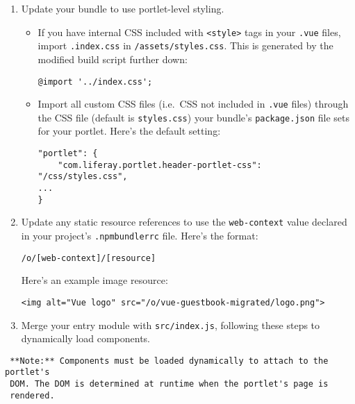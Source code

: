 \begin{enumerate}
\def\labelenumi{\arabic{enumi}.}
\setcounter{enumi}{3}
\item
  Update your bundle to use portlet-level styling.

  \begin{itemize}
  \item
    If you have internal CSS included with
    \texttt{\textless{}style\textgreater{}} tags in your \texttt{.vue}
    files, import \texttt{.index.css} in \texttt{/assets/styles.css}.
    This is generated by the modified build script further down:

\begin{verbatim}
@import '../index.css';
\end{verbatim}
  \item
    Import all custom CSS files (i.e.~CSS not included in \texttt{.vue}
    files) through the CSS file (default is \texttt{styles.css}) your
    bundle's \texttt{package.json} file sets for your portlet. Here's
    the default setting:

\begin{verbatim}
"portlet": {
    "com.liferay.portlet.header-portlet-css": "/css/styles.css",
...
}
\end{verbatim}
  \end{itemize}
\item
  Update any static resource references to use the \texttt{web-context}
  value declared in your project's \texttt{.npmbundlerrc} file. Here's
  the format:

\begin{verbatim}
/o/[web-context]/[resource]
\end{verbatim}

  Here's an example image resource:

\begin{verbatim}
<img alt="Vue logo" src="/o/vue-guestbook-migrated/logo.png">
\end{verbatim}
\item
  Merge your entry module with \texttt{src/index.js}, following these
  steps to dynamically load components.
\end{enumerate}

\noindent\hrulefill

\begin{verbatim}
 **Note:** Components must be loaded dynamically to attach to the portlet's
 DOM. The DOM is determined at runtime when the portlet's page is
 rendered. 
\end{verbatim}

